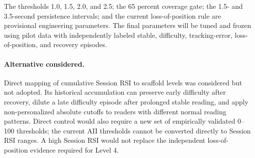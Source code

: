 The thresholds 1.0, 1.5, 2.0, and 2.5; the 65 percent coverage gate; the 1.5-
and 3.5-second persistence intervals; and the current loss-of-position rule are
provisional engineering parameters. The final parameters will be tuned and
frozen using pilot data with independently labeled stable, difficulty,
tracking-error, loss-of-position, and recovery episodes.

\paragraph{Alternative considered.}
Direct mapping of cumulative Session RSI to scaffold levels was considered but
not adopted. Its historical accumulation can preserve early difficulty after
recovery, dilute a late difficulty episode after prolonged stable reading, and
apply non-personalized absolute cutoffs to readers with different normal reading
patterns. Direct control would also require a new set of empirically validated
0--100 thresholds; the current AII thresholds cannot be converted directly to
Session RSI ranges. A high Session RSI would not replace the independent
loss-of-position evidence required for Level 4.
